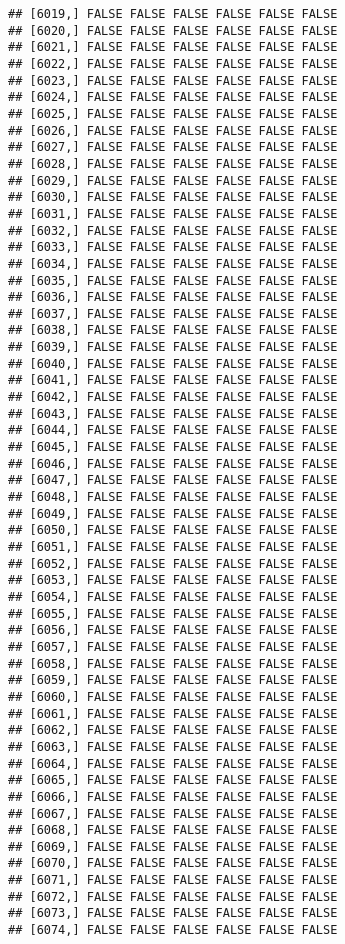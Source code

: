\documentclass[
]{article}
\begin{document}
\begin{verbatim}
## [6019,] FALSE FALSE FALSE FALSE FALSE FALSE
## [6020,] FALSE FALSE FALSE FALSE FALSE FALSE
## [6021,] FALSE FALSE FALSE FALSE FALSE FALSE
## [6022,] FALSE FALSE FALSE FALSE FALSE FALSE
## [6023,] FALSE FALSE FALSE FALSE FALSE FALSE
## [6024,] FALSE FALSE FALSE FALSE FALSE FALSE
## [6025,] FALSE FALSE FALSE FALSE FALSE FALSE
## [6026,] FALSE FALSE FALSE FALSE FALSE FALSE
## [6027,] FALSE FALSE FALSE FALSE FALSE FALSE
## [6028,] FALSE FALSE FALSE FALSE FALSE FALSE
## [6029,] FALSE FALSE FALSE FALSE FALSE FALSE
## [6030,] FALSE FALSE FALSE FALSE FALSE FALSE
## [6031,] FALSE FALSE FALSE FALSE FALSE FALSE
## [6032,] FALSE FALSE FALSE FALSE FALSE FALSE
## [6033,] FALSE FALSE FALSE FALSE FALSE FALSE
## [6034,] FALSE FALSE FALSE FALSE FALSE FALSE
## [6035,] FALSE FALSE FALSE FALSE FALSE FALSE
## [6036,] FALSE FALSE FALSE FALSE FALSE FALSE
## [6037,] FALSE FALSE FALSE FALSE FALSE FALSE
## [6038,] FALSE FALSE FALSE FALSE FALSE FALSE
## [6039,] FALSE FALSE FALSE FALSE FALSE FALSE
## [6040,] FALSE FALSE FALSE FALSE FALSE FALSE
## [6041,] FALSE FALSE FALSE FALSE FALSE FALSE
## [6042,] FALSE FALSE FALSE FALSE FALSE FALSE
## [6043,] FALSE FALSE FALSE FALSE FALSE FALSE
## [6044,] FALSE FALSE FALSE FALSE FALSE FALSE
## [6045,] FALSE FALSE FALSE FALSE FALSE FALSE
## [6046,] FALSE FALSE FALSE FALSE FALSE FALSE
## [6047,] FALSE FALSE FALSE FALSE FALSE FALSE
## [6048,] FALSE FALSE FALSE FALSE FALSE FALSE
## [6049,] FALSE FALSE FALSE FALSE FALSE FALSE
## [6050,] FALSE FALSE FALSE FALSE FALSE FALSE
## [6051,] FALSE FALSE FALSE FALSE FALSE FALSE
## [6052,] FALSE FALSE FALSE FALSE FALSE FALSE
## [6053,] FALSE FALSE FALSE FALSE FALSE FALSE
## [6054,] FALSE FALSE FALSE FALSE FALSE FALSE
## [6055,] FALSE FALSE FALSE FALSE FALSE FALSE
## [6056,] FALSE FALSE FALSE FALSE FALSE FALSE
## [6057,] FALSE FALSE FALSE FALSE FALSE FALSE
## [6058,] FALSE FALSE FALSE FALSE FALSE FALSE
## [6059,] FALSE FALSE FALSE FALSE FALSE FALSE
## [6060,] FALSE FALSE FALSE FALSE FALSE FALSE
## [6061,] FALSE FALSE FALSE FALSE FALSE FALSE
## [6062,] FALSE FALSE FALSE FALSE FALSE FALSE
## [6063,] FALSE FALSE FALSE FALSE FALSE FALSE
## [6064,] FALSE FALSE FALSE FALSE FALSE FALSE
## [6065,] FALSE FALSE FALSE FALSE FALSE FALSE
## [6066,] FALSE FALSE FALSE FALSE FALSE FALSE
## [6067,] FALSE FALSE FALSE FALSE FALSE FALSE
## [6068,] FALSE FALSE FALSE FALSE FALSE FALSE
## [6069,] FALSE FALSE FALSE FALSE FALSE FALSE
## [6070,] FALSE FALSE FALSE FALSE FALSE FALSE
## [6071,] FALSE FALSE FALSE FALSE FALSE FALSE
## [6072,] FALSE FALSE FALSE FALSE FALSE FALSE
## [6073,] FALSE FALSE FALSE FALSE FALSE FALSE
## [6074,] FALSE FALSE FALSE FALSE FALSE FALSE

\end{verbatim}
\end{document}
